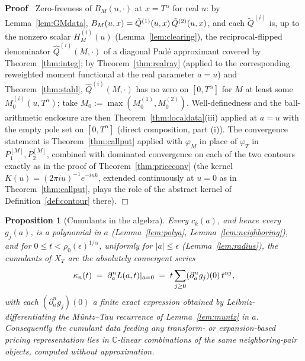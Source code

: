 \documentclass{article}
\newcommand{\assign}{:=}
\newenvironment{proof}{\noindent\textbf{Proof\ }}{\hspace*{\fill}$\Box$\medskip}
\newtheorem{proposition}{Proposition}
{\theorembodyfont{\rmfamily}\newtheorem{remark}{Remark}}
\newcommand{\C}{\mathbb{C}}
\begin{document}
\begin{proof}
  Zero-freeness of $B_M (u, \cdot)$ at $x = T^{\alpha}$ for real $u$: by
  Lemma~\ref{lem:GMdata}, $B_M (u, x) = \tilde{Q}^{(1)} (u, x)  \hspace{0.17em}
  \tilde{Q}^{(2)} (u, x)$, and each $\tilde{Q}^{(i)}$ is, up to the nonzero
  scalar $H_M^{(i)} (u)$ (Lemma~\ref{lem:clearing}), the reciprocal-flipped
  denominator $\hat{Q}^{(i)} (M, \cdot)$ of a diagonal Pad{\'e} approximant
  covered by Theorem~\ref{thm:integ}; by Theorem~\ref{thm:realray} (applied
  to the corresponding reweighted moment functional at the real parameter
  $a = u$) and Theorem~\ref{thm:stahl}, $\hat{Q}^{(i)} (M, \cdot)$ has no
  zero on $[0, T^{\alpha}]$ for $M$ at least some $M_0^{(i)} (u,
  T^{\alpha})$; take $M_0 \assign \max (M_0^{(1)}, M_0^{(2)})$. Well-definedness
  and the ball-arithmetic enclosure are then Theorem~\ref{thm:localdata}(iii)
  applied at $a = u$ with the empty pole set on $[0, T^{\alpha}]$
  (direct composition, part (i)). The convergence statement is
  Theorem~\ref{thm:callput} applied with $\varphi_M$ in place of $\varphi_T$
  in $P_1^{[M]}, P_2^{[M]}$, combined with dominated convergence on each of
  the two contours exactly as in the proof of Theorem~\ref{thm:priceconv}
  (the kernel $K (u) = (2 \pi iu)^{- 1} e^{- iuk}$, extended continuously at
  $u = 0$ as in Theorem~\ref{thm:callput}, plays the role of the abstract
  kernel of Definition~\ref{def:contour} there).
\end{proof}

\begin{proposition}
  [Cumulants in the algebra]\label{prop:cumulants} Every $c_k (a)$, and hence
  every $g_j (a)$, is a polynomial in $a$ (Lemma~\ref{lem:polya},
  Lemma~\ref{lem:neighboring}), and for $0 \le t < \rho_0 (\epsilon)^{1 /
  \alpha}$, uniformly for $|a | \le \epsilon$ (Lemma~\ref{lem:radius}), the
  cumulants of $X_T$ are the absolutely convergent series
  \[ \kappa_n (t) \hspace{0.27em} = \hspace{0.27em} \partial_a^n L (a, t) |_{a
     = 0} \hspace{0.27em} = \hspace{0.27em} t \sum_{j \ge 0} (\partial_a^n
     g_j) (0)  \hspace{0.17em} t^{\alpha j}, \]
  with each $(\partial_a^n g_j) (0)$ a finite exact expression obtained by
  Leibniz-differentiating the M{\"u}ntz--Tau recurrence of
  Lemma~\ref{lem:muntz} in $a$. Consequently the cumulant data feeding any
  transform- or expansion-based pricing representation lies in
  $\C$-linear combinations of the same neighboring-pair objects, computed
  without approximation.
\end{proposition}
\end{document}
